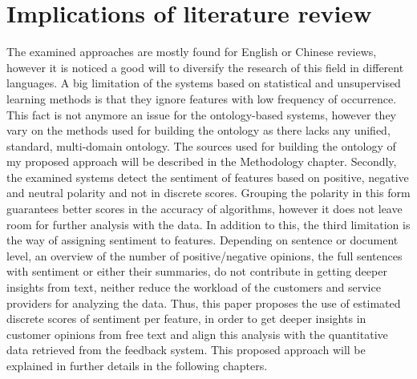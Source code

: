 \section{Implications of literature review}
The examined approaches are mostly found for English or Chinese reviews, however it is noticed a good will to diversify the research of this field in different languages. A big limitation of the systems based on statistical and unsupervised learning methods is that they ignore features with low frequency of occurrence. This fact is not anymore an issue for the ontology-based systems, however they vary on the methods used for building the ontology as there lacks any unified, standard, multi-domain ontology. The sources used for building the ontology of my proposed approach will be described in the Methodology chapter.
Secondly, the examined systems detect the sentiment of features based on positive, negative and neutral polarity and not in discrete scores. Grouping the polarity in this form guarantees better scores in the accuracy of algorithms, however it does not leave room for further analysis with the data.
In addition to this, the third limitation is the way of assigning sentiment to features. Depending on sentence or document level, an overview of the number of positive/negative opinions, the full sentences with sentiment or either their summaries, do not contribute in getting deeper insights from text, neither reduce the workload of the customers and service providers for analyzing the data.
Thus, this paper proposes the use of estimated discrete scores of sentiment per feature, in order to get deeper insights in customer opinions from free text and align this analysis with the quantitative data retrieved from the feedback system. This proposed approach will be explained in further details in the following chapters.
